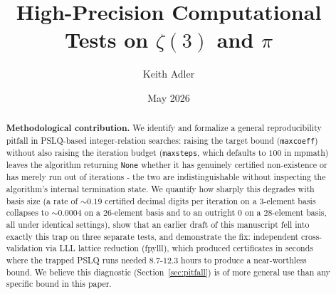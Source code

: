 \documentclass[12pt]{article}
\title{High-Precision Computational Tests on $\zeta(3)$ and $\pi$}
\author{Keith Adler}
\date{May 2026}
\theoremstyle{definition}
\theoremstyle{remark}
\begin{document}
\maketitle

\begin{abstract}
\textbf{Methodological contribution.}  We identify and formalize a
general reproducibility pitfall in PSLQ-based integer-relation
searches: raising the target bound (\texttt{maxcoeff}) without also
raising the iteration budget (\texttt{maxsteps}, which defaults to
$100$ in mpmath) leaves the algorithm returning \texttt{None} whether
it has genuinely certified non-existence or has merely run out of
iterations - the two are indistinguishable without inspecting the
algorithm's internal termination state.  We quantify how sharply this
degrades with basis size (a rate of $\sim 0.19$ certified decimal
digits per iteration on a $3$-element basis collapses to
$\sim 0.0004$ on a $26$-element basis and to an outright $0$ on a
$28$-element basis, all under identical settings), show that an
earlier draft of this manuscript fell into exactly this trap on three
separate tests, and demonstrate the fix: independent cross-validation
via LLL lattice reduction (fpylll), which produced certificates in
seconds where the trapped PSLQ runs needed $8.7$-$12.3$ hours to
produce a near-worthless bound.  We believe this diagnostic
(Section~\ref{sec:pitfall}) is of more general use than any specific
bound in this paper.


\end{abstract}
\end{document}
